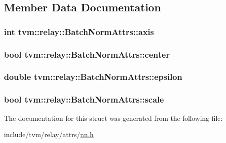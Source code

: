 \subsection{Member Data Documentation}
\subsubsection[{\texorpdfstring{axis}{axis}}]{\setlength{\rightskip}{0pt plus 5cm}int tvm\+::relay\+::\+Batch\+Norm\+Attrs\+::axis}\hypertarget{structtvm_1_1relay_1_1BatchNormAttrs_a162a37ae1c83ff610f1743ac91013d88}{}\label{structtvm_1_1relay_1_1BatchNormAttrs_a162a37ae1c83ff610f1743ac91013d88}
\subsubsection[{\texorpdfstring{center}{center}}]{\setlength{\rightskip}{0pt plus 5cm}bool tvm\+::relay\+::\+Batch\+Norm\+Attrs\+::center}\hypertarget{structtvm_1_1relay_1_1BatchNormAttrs_ab0ad1e2be87f4e12d9e46b2da6c12713}{}\label{structtvm_1_1relay_1_1BatchNormAttrs_ab0ad1e2be87f4e12d9e46b2da6c12713}
\subsubsection[{\texorpdfstring{epsilon}{epsilon}}]{\setlength{\rightskip}{0pt plus 5cm}double tvm\+::relay\+::\+Batch\+Norm\+Attrs\+::epsilon}\hypertarget{structtvm_1_1relay_1_1BatchNormAttrs_acbdb18e57584b13352e7470f2948db15}{}\label{structtvm_1_1relay_1_1BatchNormAttrs_acbdb18e57584b13352e7470f2948db15}
\subsubsection[{\texorpdfstring{scale}{scale}}]{\setlength{\rightskip}{0pt plus 5cm}bool tvm\+::relay\+::\+Batch\+Norm\+Attrs\+::scale}\hypertarget{structtvm_1_1relay_1_1BatchNormAttrs_a24be5ce23e38232943c34324885377ff}{}\label{structtvm_1_1relay_1_1BatchNormAttrs_a24be5ce23e38232943c34324885377ff}


The documentation for this struct was generated from the following file\+:\begin{DoxyCompactItemize}
\item 
include/tvm/relay/attrs/\hyperlink{include_2tvm_2relay_2attrs_2nn_8h}{nn.\+h}\end{DoxyCompactItemize}
